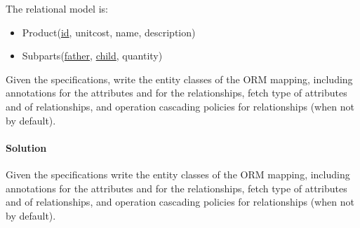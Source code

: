 The relational model is: 
\begin{itemize}
    \item Product(\underline{id}, unitcost, name, description)
    \item Subparts(\underline{father}, \underline{child}, quantity)
\end{itemize}
Given the specifications, write the entity classes of the ORM mapping, including annotations for the attributes and for the relationships, fetch type of 
attributes and of relationships, and operation cascading policies for relationships (when not by default).

\paragraph*{Solution}
Given the specifications write the entity classes of the ORM mapping, including annotations for the attributes and for the relationships, fetch type of attributes
and of relationships, and operation cascading policies for relationships (when not by default). 

